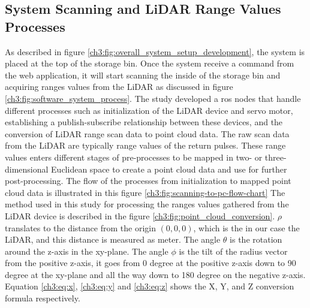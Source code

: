 



\subsection{System Scanning and LiDAR Range Values Processes}
As described in figure \ref{ch3:fig:overall_system_setup_development}, the system is placed at the top of the storage bin. Once the system receive a command from the web application, it will start scanning the inside of the storage bin and acquiring ranges values from the LiDAR as discussed in figure \ref{ch3:fig:software_system_process}. The study developed a ros nodes that handle different processes such as initialization of the LiDAR device and servo motor, establishing a publish-subscribe relationship between these devices, and the conversion of LiDAR range scan data to point cloud data. The raw scan data from the LiDAR are typically range values of the return pulses. These range values enters different stages of pre-processes to be mapped in two- or three-dimensional Euclidean space to create a point cloud data and use for further post-processing. The flow of the processes from initialization to mapped point cloud data is illustrated in this figure \ref{ch3:fig:scanning-to-pc-flow-chart} The method used in this study for processing the ranges values gathered from the LiDAR device is described in the figure \ref{ch3:fig:point_cloud_conversion}.  $\rho$ translates to the distance from the origin $(0,0,0)$, which is the in our case the LiDAR, and this distance is measured as meter. The angle $\theta$ is the rotation around the z-axis in the xy-plane. The angle $\phi$ is the tilt of the radius vector from the positive z-axis, it goes from 0 degree at the positive z-axis down to 90 degree at the xy-plane and all the way down to 180 degree on the negative z-axis. Equation \ref{ch3:eq:x}, \ref{ch3:eq:y} and \ref{ch3:eq:z} shows the X, Y, and Z conversion formula respectively.


